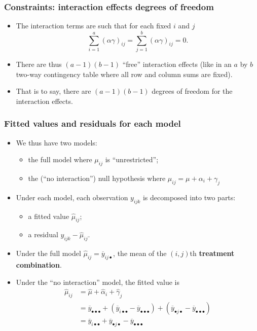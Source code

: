 \documentclass[a4paper]{article}\usepackage[]{graphicx}\usepackage[]{xcolor}
\begin{document}
\subsubsection{Constraints: interaction effects degrees of freedom}
\begin{itemize}
	\item The interaction terms are such that for each fixed \( i \) and \( j \)
	\[
	\sum_{i=1}^{a} (\alpha \gamma)_{ij} = \sum_{j=1}^{b} (\alpha \gamma)_{ij} = 0.
	\]
	\item There are thus \( (a-1)(b-1) \) ``free''  interaction effects (like in an \( a \) by \( b \) two-way contingency table where all row and column sums are fixed).
	\item That is to say, there are \( (a-1)(b-1) \) degrees of freedom for the interaction effects.
\end{itemize}  
\subsubsection{Fitted values and residuals for each model}
\begin{itemize}
	\item We thus have two models:
	\begin{itemize}
		\item the full model where \( \mu_{ij} \) is ``unrestricted'';
		\item the (``no interaction'') null hypothesis where \( \mu_{ij}=\mu+\alpha_i+\gamma_j \)
	\end{itemize}
	\item Under each model, each observation \( y_{ijk} \) is decomposed into two parts:
	\begin{itemize}
		\item a fitted value \( \hat{\mu}_{ij} \);
		\item a residual \( y_{ijk} - \hat{\mu}_{ij} \).
	\end{itemize}
	\item Under the full model \( \hat{\mu}_{ij} = \overline{y}_{ij\bullet} \), the mean of the \( (i,j) \)th \textbf{treatment combination}.
	\item Under the ``no interaction'' model, the fitted value is
	\begin{align*}
		\hat\mu_{ij} &= \hat\mu + \hat{\alpha}_i+ \hat{\gamma}_j \\
		&= \overline y_{\bullet\bullet\bullet}+(\overline y_{i\bullet\bullet}-\overline y_{\bullet\bullet\bullet}) + (\overline y_{\bullet j\bullet}-\overline y_{\bullet\bullet\bullet}) \\
		&= \overline y_{i\bullet\bullet}+\overline y_{\bullet j \bullet}- \overline y_{\bullet\bullet\bullet}
	\end{align*}
\end{itemize}
\end{document}
